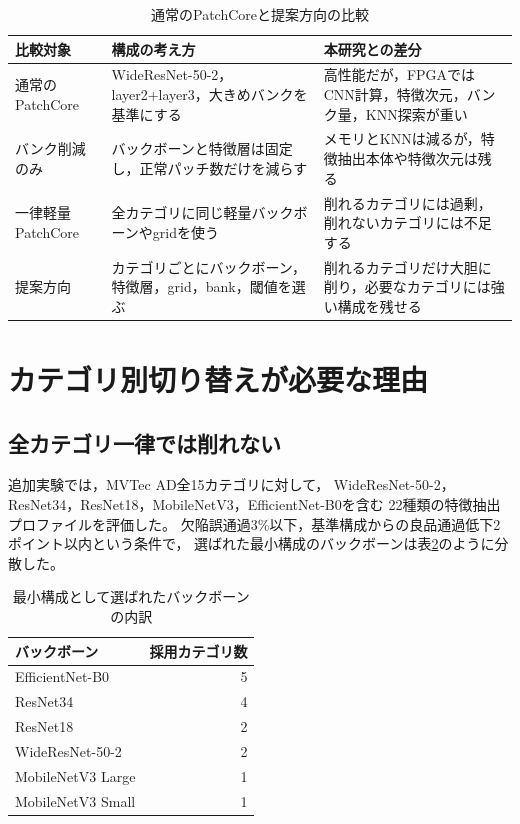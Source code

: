 \documentclass[uplatex,dvipdfmx,a4paper,11pt]{jsarticle}
\begin{document}
\begin{table}[t]
  \centering
  \caption{通常のPatchCoreと提案方向の比較}
  \label{tab:ordinary-vs-profiled-patchcore}
  \begin{tabular}{p{40mm}p{48mm}p{66mm}}
    \toprule
    比較対象 & 構成の考え方 & 本研究との差分 \\
    \midrule
    通常のPatchCore &
    WideResNet-50-2，layer2+layer3，大きめバンクを基準にする &
    高性能だが，FPGAではCNN計算，特徴次元，バンク量，KNN探索が重い \\
    バンク削減のみ &
    バックボーンと特徴層は固定し，正常パッチ数だけを減らす &
    メモリとKNNは減るが，特徴抽出本体や特徴次元は残る \\
    一律軽量PatchCore &
    全カテゴリに同じ軽量バックボーンやgridを使う &
    削れるカテゴリには過剰，削れないカテゴリには不足する \\
    提案方向 &
    カテゴリごとにバックボーン，特徴層，grid，bank，閾値を選ぶ &
    削れるカテゴリだけ大胆に削り，必要なカテゴリには強い構成を残せる \\
    \bottomrule
  \end{tabular}
\end{table}

\section{カテゴリ別切り替えが必要な理由}

\subsection{全カテゴリ一律では削れない}

追加実験では，MVTec AD全15カテゴリに対して，
WideResNet-50-2，ResNet34，ResNet18，MobileNetV3，EfficientNet-B0を含む
22種類の特徴抽出プロファイルを評価した。
欠陥誤通過3\%以下，基準構成からの良品通過低下2ポイント以内という条件で，
選ばれた最小構成のバックボーンは表\ref{tab:backbone-floor}のように分散した。

\begin{table}[t]
  \centering
  \caption{最小構成として選ばれたバックボーンの内訳}
  \label{tab:backbone-floor}
  \begin{tabular}{lr}
    \toprule
    バックボーン & 採用カテゴリ数 \\
    \midrule
    EfficientNet-B0 & 5 \\
    ResNet34 & 4 \\
    ResNet18 & 2 \\
    WideResNet-50-2 & 2 \\
    MobileNetV3 Large & 1 \\
    MobileNetV3 Small & 1 \\
    \bottomrule
  \end{tabular}
\end{table}
\end{document}
